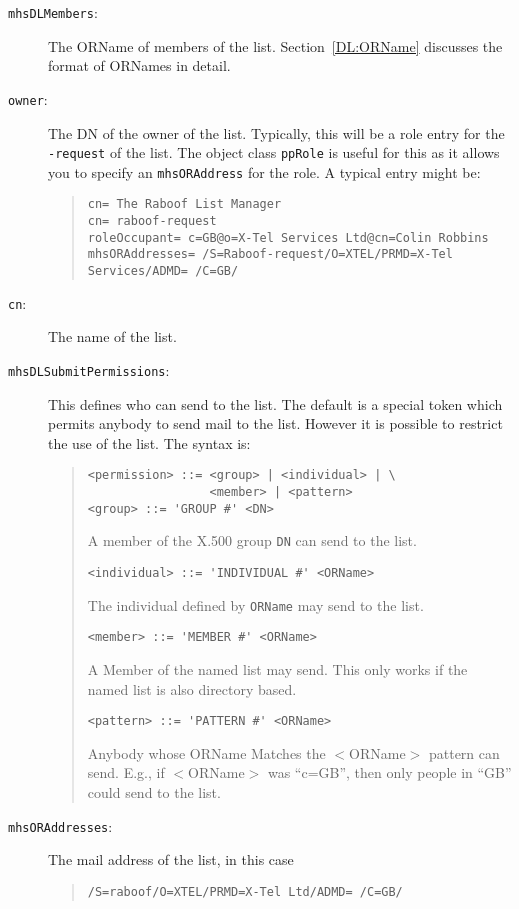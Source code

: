\begin{description}
\item[\verb+mhsDLMembers+:] 
	The ORName of members of the list.  Section~\ref{DL:ORName}
	discusses the format of ORNames in detail.

\item[\verb+owner+:]
	The DN of the owner of the list.  Typically, this will be a
	role entry for the \verb+-request+ of the list.  The object
	class \verb+ppRole+ is useful for this as it allows you to
	specify an \verb+mhsORAddress+ for the role.  A typical entry
	might be:
	\begin{quote}\footnotesize\begin{verbatim}
cn= The Raboof List Manager
cn= raboof-request
roleOccupant= c=GB@o=X-Tel Services Ltd@cn=Colin Robbins
mhsORAddresses= /S=Raboof-request/O=XTEL/PRMD=X-Tel Services/ADMD= /C=GB/
	\end{verbatim}	\end{quote}

\item[\verb+cn+:]
	The name of the list.

\item[\verb+mhsDLSubmitPermissions+:]
	This defines who can send to the list.
	The default is a special token  which permits
	anybody to send mail to the list.  However it is
	possible to restrict the use of the list. The syntax is:
	\begin{quote}\begin{verbatim}
<permission> ::= <group> | <individual> | \
                 <member> | <pattern>
<group> ::= 'GROUP #' <DN>
	\end{verbatim}
A member of the X.500 group \verb+DN+ can send to the list.
	\begin{verbatim}
<individual> ::= 'INDIVIDUAL #' <ORName>
	\end{verbatim}
The individual defined by \verb+ORName+ may send to the list.
	\begin{verbatim}
<member> ::= 'MEMBER #' <ORName>
	\end{verbatim}
A Member of the named list may send.
This only works if the named list is also directory based.
	\begin{verbatim}
<pattern> ::= 'PATTERN #' <ORName>
	\end{verbatim}
Anybody whose ORName Matches the $<$ORName$>$ pattern can send.
E.g., if $<$ORName$>$ was ``c=GB'', then only people in ``GB'' could send
to the list.
	\end{quote}
\item[\verb+mhsORAddresses+:]
	The mail address of the list, in this case
	\begin{quote}\small\begin{verbatim}
/S=raboof/O=XTEL/PRMD=X-Tel Ltd/ADMD= /C=GB/
	\end{verbatim}\end{quote}
\end{description}

